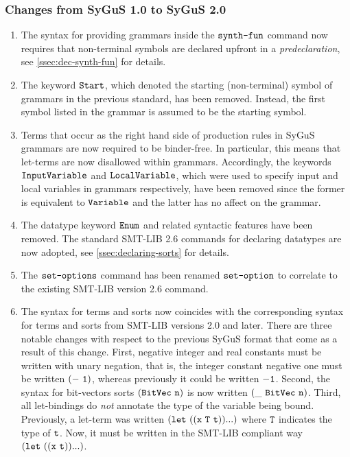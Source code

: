 \documentclass[english,a4paper,10pt]{article}
\begin{document}
\subsubsection{Changes from SyGuS 1.0 to SyGuS 2.0}
\begin{enumerate}

\item The syntax for providing grammars inside the $\texttt{synth-fun}$ command
now requires that non-terminal symbols are declared upfront
in a \emph{predeclaration}, see \cref{ssec:dec-synth-fun}
for details.

\item 
The keyword ${\tt Start}$, which 
denoted the starting (non-terminal) symbol of
grammars in the previous standard, has been removed.
Instead, the first symbol listed in the grammar is assumed
to be the starting symbol.

\item 
Terms that occur as the right hand side of production rules in
SyGuS grammars are now required to be binder-free.
In particular, this means that let-terms are now disallowed within grammars.
Accordingly,
the keywords $\texttt{InputVariable}$ and $\texttt{LocalVariable}$,
which were used to specify input and local variables in grammars
respectively, have been removed since the former is equivalent to $\texttt{Variable}$
and the latter has no affect on the grammar.

\item The datatype keyword $\texttt{Enum}$
and related syntactic features have been removed.
The standard SMT-LIB 2.6 commands
for declaring datatypes are now adopted,
see \cref{ssec:declaring-sorts} for details.

\item The $\texttt{set-options}$ command has been renamed $\texttt{set-option}$ to 
correlate to the existing SMT-LIB version 2.6 command.

\item 
The syntax for terms and sorts
now coincides with the corresponding syntax for terms and sorts 
from SMT-LIB versions 2.0 and later.
There are three notable changes
with respect to the previous SyGuS format that come as a result of this change.
First,
negative integer and real constants must be written with
unary negation, that is, the integer constant negative one
must be written ${\tt (-\ 1)}$, whereas previously it could
be written ${\tt -1}$.
Second,
the syntax for bit-vectors sorts ${\tt (BitVec\ n)}$
is now written  ${\tt (\_\ BitVec\ n)}$.
Third,
all let-bindings do \emph{not} annotate the type of the variable being bound.
Previously, a let-term was written ${\tt (let\ ((x\ T\ t)) ...)}$
where ${\tt T}$ indicates the type of ${\tt t}$.
Now, it must be written in the SMT-LIB compliant
way ${\tt (let\ ((x\ t)) ...)}$.


\end{enumerate}
\end{document}

